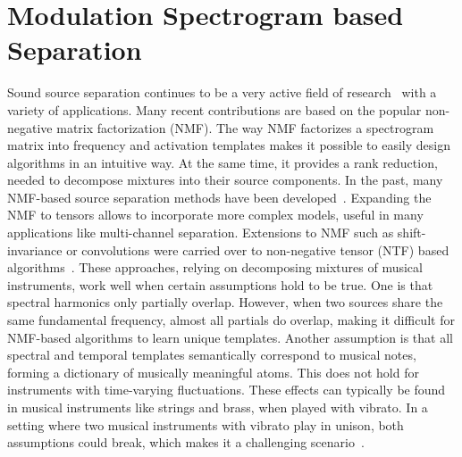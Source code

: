 \section{Modulation Spectrogram based Separation}

\kant[1-4]


Sound source separation continues to be a very active field of research~\cite{vincent14} with a variety of applications. Many recent contributions are based on the popular non-negative matrix factorization (NMF). The way NMF factorizes a spectrogram matrix into frequency and activation templates makes it possible to easily design algorithms in an intuitive way. At the same time, it provides a rank reduction, needed to decompose mixtures into their source components.
In the past, many NMF-based source separation methods have been developed~\cite{smaragdis03, smaragdis04, virtanen07}. Expanding the NMF to tensors allows to incorporate more complex models, useful in many applications like multi-channel separation. Extensions to NMF such as shift-invariance or convolutions were carried over to non-negative tensor (NTF) based algorithms~\cite{fitzgerald05, fitzgerald08, fitzgerald06, fevotte10, ozerov11}. These approaches, relying on decomposing mixtures of musical instruments, work well when certain assumptions hold to be true.
One is that spectral harmonics only partially overlap. However, when two sources share the same fundamental frequency, almost all partials do overlap, making it difficult for NMF-based algorithms to learn unique templates. Another assumption is that all spectral and temporal templates semantically correspond to musical notes, forming a dictionary of musically meaningful atoms.
This does not hold for instruments with time-varying fluctuations. These effects can typically be found in musical instruments like strings and brass, when played with vibrato. In a setting where two musical instruments with vibrato play in unison, both assumptions could break, which makes it a challenging scenario~\cite{stoeter14}.

